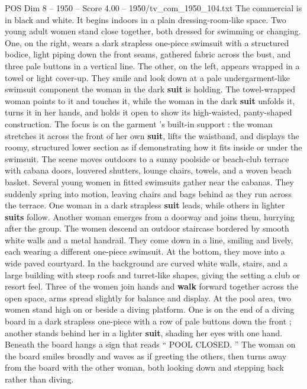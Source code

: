 \begin{textsample}{POS Dim 8 – 1950 – Score 4.00 – 1950/tv\_com\_1950\_104.txt}  \label{ex:f8_pos_079}
The commercial is in black and white.
It begins indoors in a plain dressing-room-like space.
Two young adult women stand close together, both dressed for swimming or changing.
One, on the right, wears a dark strapless one-piece swimsuit with a structured bodice, light piping down the front seams, gathered fabric across the bust, and three pale buttons in a vertical line.
The other, on the left, appears wrapped in a towel or light cover-up.
They smile and look down at a pale undergarment-like swimsuit component the woman in the dark \textbf{suit} is holding.
The towel-wrapped woman points to it and touches it, while the woman in the dark \textbf{suit} unfolds it, turns it in her hands, and holds it open to show its high-waisted, panty-shaped construction.
The focus is on the garment ’s built-in support : the woman stretches it across the front of her own \textbf{suit}, lifts the waistband, and displays the roomy, structured lower section as if demonstrating how it fits inside or under the swimsuit.
The scene moves outdoors to a sunny poolside or beach-club terrace with cabana doors, louvered shutters, lounge chairs, towels, and a woven beach basket.
Several young women in fitted swimsuits gather near the cabanas.
They suddenly spring into motion, leaving chairs and bags behind as they run across the terrace.
One woman in a dark strapless \textbf{suit} leads, while others in lighter \textbf{suits} follow.
Another woman emerges from a doorway and joins them, hurrying after the group.
The women descend an outdoor staircase bordered by smooth white walls and a metal handrail.
They come down in a line, smiling and lively, each wearing a different one-piece swimsuit.
At the bottom, they move into a wide paved courtyard.
In the background are curved white walls, stairs, and a large building with steep roofs and turret-like shapes, giving the setting a club or resort feel.
Three of the women join hands and \textbf{walk} forward together across the open space, arms spread slightly for balance and display.
At the pool area, two women stand high on or beside a diving platform.
One is on the end of a diving board in a dark strapless one-piece with a row of pale buttons down the front ; another stands behind her in a lighter \textbf{suit}, shading her eyes with one hand.
Beneath the board hangs a sign that reads “ POOL CLOSED. ” The woman on the board smiles broadly and waves as if greeting the others, then turns away from the board with the other woman, both looking down and stepping back rather than diving.

\end{textsample}
